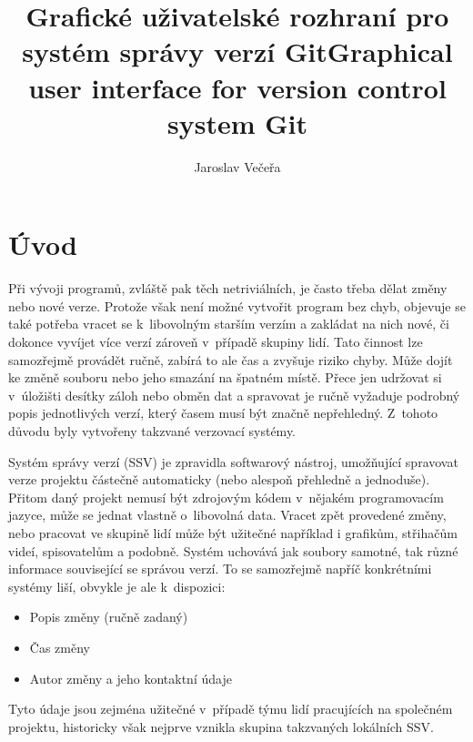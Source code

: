 \documentclass[
  biblatex,
  glossaries,
  index
]{kidiplom}
\title{Grafické uživatelské rozhraní pro systém správy verzí Git}
\title[english]{Graphical user interface for version control system Git}
\author{Jaroslav Večeřa}
\begin{document}
\maketitle



\newcommand{\BibLaTeX}{\textsc{Bib}\LaTeX}

\section{Úvod}
Při vývoji programů, zvláště pak těch netriviálních, je často třeba
dělat změny nebo nové verze. Protože však není možné vytvořit program
bez chyb, objevuje se také potřeba vracet se k~libovolným starším
verzím a zakládat na nich nové, či dokonce vyvíjet více verzí zároveň
v~případě skupiny lidí. Tato činnost lze samozřejmě provádět ručně,
zabírá to ale čas a zvyšuje riziko chyby. Může dojít ke změně souboru
nebo jeho smazání na špatném místě. Přece jen udržovat si v~úložišti
desítky záloh nebo obměn dat a spravovat je ručně vyžaduje podrobný
popis jednotlivých verzí, který časem musí být značně nepřehledný.
Z~tohoto důvodu byly vytvořeny takzvané verzovací systémy.

Systém správy verzí (SSV) je zpravidla softwarový nástroj,
umožňující spravovat verze projektu částečně automaticky (nebo alespoň
přehledně a jednoduše). Přitom daný projekt nemusí být zdrojovým kódem
v~nějakém programovacím jazyce, může se jednat vlastně o~libovolná data.
Vracet zpět provedené změny, nebo pracovat ve skupině lidí může být
užitečné například i grafikům, střihačům videí, spisovatelům a podobně.
Systém uchovává jak soubory samotné, tak různé informace související
se správou verzí. To se samozřejmě napříč konkrétními systémy liší,
obvykle je ale k~dispozici:
\begin{itemize}
\item Popis změny (ručně zadaný)
\item Čas změny
\item Autor změny a jeho kontaktní údaje
\end{itemize}

Tyto údaje jsou zejména užitečné v~případě týmu lidí pracujících na
společném projektu, historicky však nejprve vznikla skupina takzvaných
lokálních SSV.
\end{document}

